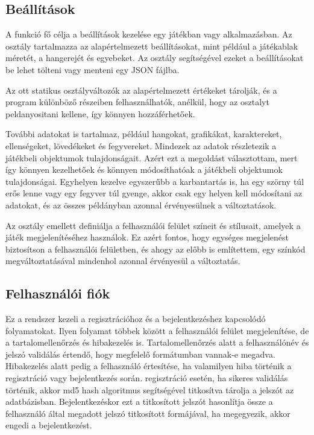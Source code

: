 \subsection{Beállítások}
\indent \indent A funkció fő célja a beállítások kezelése egy játékban vagy alkalmazásban. Az osztály tartalmazza az alapértelmezett beállításokat, mint például a játékablak méretét, a hangerejét és egyebeket. Az osztály segítségével ezeket a beállításokat be lehet tölteni vagy menteni egy JSON fájlba.

Az ott statikus osztályváltozók az alapértelmezett értékeket tárolják, és a program különböző részeiben felhasználhatók, anélkül, hogy az osztalyt peldanyositani kellene, így könnyen hozzáférhetőek.

További adatokat is tartalmaz, például hangokat, grafikákat, karaktereket, ellenségeket, lövedékeket és fegyvereket. Mindezek az adatok részletezik a játékbeli objektumok tulajdonságait. Azért ezt a megoldást választottam, mert így könnyen kezelhetőek és könnyen módosíthatóak a játékbeli objektumok tulajdonságai. Egyhelyen kezelve egyszerűbb a karbantartás is, ha egy szörny túl erős lenne vagy egy fegyver túl gyenge, akkor csak egy helyen kell módosítani az adatokat, és az összes példányban azonnal érvényesülnek a változtatások.

Az osztály emellett definiálja a felhasználói felület színeit és stílusait, amelyek a játék megjelenítéséhez használok. Ez azért fontos, hogy egységes megjelenést biztosítson a felhasználói felületben, és ahogy az előbb is említettem, egy színkód megváltoztatásával mindenhol azonnal érvényesül a változtatás.


\subsection{Felhasználói fiók}
\indent \indent Ez a rendszer kezeli a regisztrációhoz és a bejelentkezéshez kapcsolódó folyamatokat. Ilyen folyamat többek között a felhasználói felület megjelenítése, de a tartalomellenőrzés és hibakezelés is. Tartalomellenőrzés alatt a felhasználónév és jelszó validálás értendő, hogy megfelelő formátumban vannak-e megadva. Hibakezelés alatt pedig a felhasználó értesítése, ha valamilyen hiba történik a regisztráció vagy bejelentkezés során. regisztráció esetén, ha sikeres validálás történik, akkor md5 hash algoritmus segítségével titkosítva tárolja a jelszót az adatbázisban. Bejelentkezéskor ezt a titkosított jelszót hasonlítja össze a felhasználó által megadott jelszó titkosított formájával, ha megegyezik, akkor engedi a bejelentkezést.

